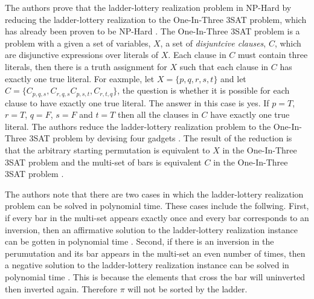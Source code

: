 \pagebreak
The authors prove that the ladder-lottery realization problem in NP-Hard
by reducing the ladder-lottery realization to the One-In-Three 3SAT problem, 
which has already been proven to be NP-Hard \cite{A3}. The One-In-Three 3SAT 
problem is a problem with a given a set of variables, $X$, a set 
of \emph{disjuntcive clauses}, $C$, which are disjunctive expressions over 
literals of $X$. Each clause in $C$ 
must contain three literals, then there is a truth assignment for $X$ such that 
each clause in $C$ has exactly one true literal. For eaxmple, let 
$X=\{p, q, r, s, t\}$ and let $C=\{C_{p,q,s}, C_{r,q,s} C_{p,s,t}, C_{r,t,q}\}$,
the question is whether it is possible for each clause to have exactly one
true literal. The answer in this case is yes. If $p=T$, $r=T$, $q=F$, $s=F$
 and $t=T$ then all the clauses in $C$ have exactly one true literal. 
 The authors reduce the ladder-lottery realization problem to the
One-In-Three 3SAT problem by devising four gadgets \cite{A3}. The result of 
the reduction is that the arbitrary starting permutation is equivalent 
to $X$ in the One-In-Three 3SAT 
problem and the multi-set of bars is equivalent $C$ in the One-In-Three 
3SAT problem \cite{A3}.\par 
The authors note that there are two cases in which the ladder-lottery
realization problem can be solved in polynomial time. These cases 
include the follwing. First, if every bar in the multi-set appears
exactly once and every bar corresponds to an inversion, 
then an affirmative solution to the ladder-lottery realization 
instance can be gotten in polynomial time \cite{A3}. 
Second, if there is an inversion in the perumutation and its bar appears in the multi-set an even 
number of times, then a negative solution to
the ladder-lottery realization instance
can be solved in polynomial time \cite{A3}. This is because the elements that cross the bar will 
uninverted then inverted again. Therefore $\pi$ will not be sorted by the ladder.\par